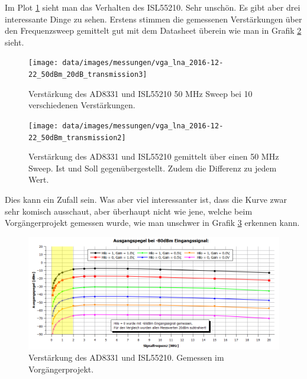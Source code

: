 Im Plot \ref{fig:T_broken_ISL55210} sieht man das Verhalten des ISL55210. Sehr unschön. Es gibt aber drei interessante Dinge zu sehen.
Erstens stimmen die gemessenen Verstärkungen über den Frequenzsweep gemittelt gut mit dem Datasheet überein wie man in Grafik \ref{fig:T_broken_mean_ISL55210} sieht.

\begin{figure}[H]
\begin{center}
    \texttt{[image: data/images/messungen/vga\_lna\_2016-12-22\_50dBm\_20dB\_transmission3]}
    \caption{Verstärkung des AD8331 und ISL55210 50 MHz Sweep bei 10 verschiedenen Verstärkungen.}
    \label{fig:T_broken_ISL55210}
\end{center}
\end{figure}

\begin{figure}[H]
\begin{center}
    \texttt{[image: data/images/messungen/vga\_lna\_2016-12-22\_50dBm\_transmission2]}
    \caption{Verstärkung des AD8331 und ISL55210 gemittelt über einen 50 MHz Sweep. Ist und Soll gegenübergestellt. Zudem die Differenz zu jedem Wert.}
    \label{fig:T_broken_mean_ISL55210}
\end{center}
\end{figure}

Dies kann ein Zufall sein. Was aber viel interessanter ist, dass die Kurve zwar sehr komisch ausschaut, aber überhaupt nicht wie jene, welche beim Vorgängerprojekt gemessen wurde, wie man unschwer in Grafik \ref{fig:ganzes_system_vorganger} erkennen kann.

\begin{figure}[H]
\begin{center}
    \includegraphics[width=1\textwidth]{data/images/ganzes_system_vorganger}
    \caption{Verstärkung des AD8331 und ISL55210. Gemessen im Vorgängerprojekt\cite{SDRprev}.}
    \label{fig:ganzes_system_vorganger}
\end{center}
\end{figure}

